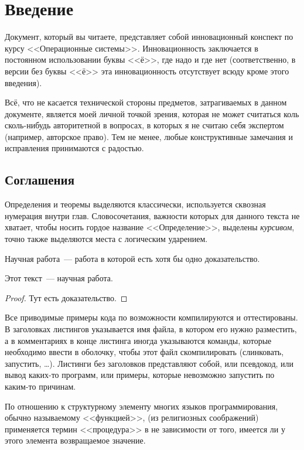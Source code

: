 \chapter*{Введение}
Документ, который вы читаете, представляет собой инновационный конспект по курсу <<Операционные системы>>.
Инновационность заключается в постоянном использовании буквы <<ё>>, где надо и где нет (соответственно, в версии без буквы <<ё>> эта инновационность отсутствует всюду кроме этого введения).

Всё, что не касается технической стороны предметов, затрагиваемых в данном документе, является моей личной точкой зрения, которая не может считаться коль сколь-нибудь авторитетной в вопросах, в которых я не считаю себя экспертом (например, авторское право).
Тем не менее, любые конструктивные замечания и исправления принимаются с радостью.

\section*{Соглашения}
Определения и теоремы выделяются классически, используется сквозная нумерация внутри глав.
Словосочетания, важности которых для данного текста не хватает, чтобы носить гордое название <<Определение>>, выделены \emph{курсивом}, точно также выделяются места с логическим ударением.

\begin{definition}
Научная работа~--- работа в которой есть хотя бы одно доказательство.
\end{definition}

\begin{theorem}
Этот текст~--- научная работа.
\end{theorem}

\begin{proof}
Тут есть доказательство.
\end{proof}

Все приводимые примеры кода по возможности компилируются и оттестированы.
В заголовках листингов указывается имя файла, в котором его нужно разместить, а в комментариях в конце листинга иногда указываются команды, которые необходимо ввести в оболочку, чтобы этот файл скомпилировать (слинковать, запустить, \dots).
Листинги без заголовков представляют собой, или псевдокод, или вывод каких-то программ, или примеры, которые невозможно запустить по каким-то причинам.

По отношению к структурному элементу многих языков программирования, обычно называемому <<функцией>>, (из религиозных соображений) применяется термин <<процедура>> в не зависимости от того, имеется ли у этого элемента возвращаемое значение.

